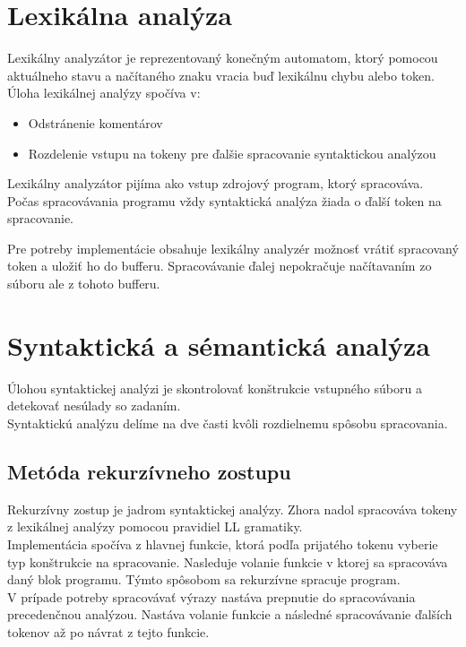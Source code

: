 \documentclass[a4paper]{article}
\begin{document}
\section{Lexikálna analýza}
Lexikálny analyzátor je reprezentovaný konečným automatom, ktorý pomocou aktuálneho stavu a načítaného znaku vracia buď lexikálnu chybu alebo token. Úloha lexikálnej analýzy spočíva v:
\begin{itemize}
\item{Odstránenie komentárov}
\item{Rozdelenie vstupu na tokeny pre ďalšie spracovanie syntaktickou analýzou}
\end{itemize}
Lexikálny analyzátor pijíma ako vstup zdrojový program, ktorý spracováva. Počas spracovávania programu vždy syntaktická analýza žiada o ďalší token na spracovanie.

Pre potreby implementácie obsahuje lexikálny analyzér možnosť vrátiť spracovaný token a uložiť ho do bufferu. Spracovávanie ďalej nepokračuje načítavaním zo súboru ale z tohoto bufferu.

\section{Syntaktická a sémantická analýza}
Úlohou syntaktickej analýzi je skontrolovať konštrukcie vstupného súboru a detekovať nesúlady so zadaním.\\
Syntaktickú analýzu delíme na dve časti kvôli rozdielnemu spôsobu spracovania.

\subsection{Metóda rekurzívneho zostupu}
Rekurzívny zostup je jadrom syntaktickej analýzy. Zhora nadol spracováva tokeny z lexikálnej analýzy pomocou pravidiel LL gramatiky. \\
Implementácia spočíva z hlavnej funkcie, ktorá podľa prijatého tokenu vyberie typ konštrukcie na spracovanie. Nasleduje volanie funkcie v ktorej sa spracováva daný blok programu. Týmto spôsobom sa rekurzívne spracuje program.\\
V prípade potreby spracovávať výrazy nastáva prepnutie do spracovávania precedenčnou analýzou. Nastáva volanie funkcie a následné spracovávanie ďalších tokenov až po návrat z tejto funkcie.
\end{document}
